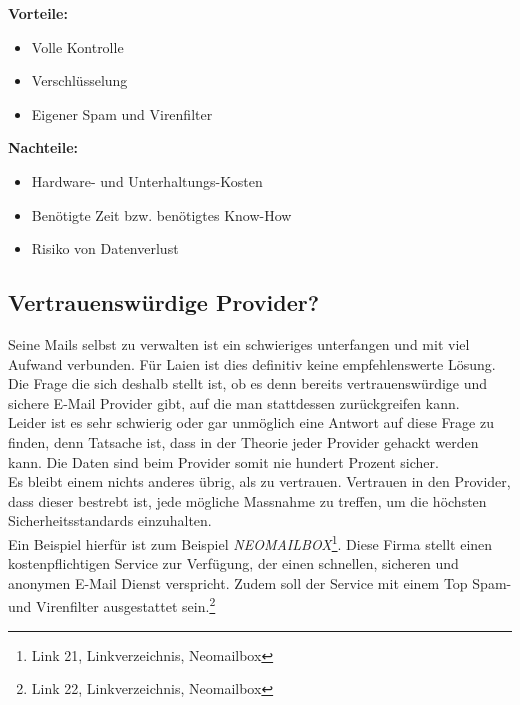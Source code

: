 \textbf{Vorteile:}
\begin{itemize}
    \item Volle Kontrolle
    \item Verschlüsselung
    \item Eigener Spam und Virenfilter
\end{itemize}

\textbf{Nachteile:}
\begin{itemize}
    \item Hardware- und Unterhaltungs-Kosten
    \item Benötigte Zeit bzw. benötigtes Know-How
    \item Risiko von Datenverlust
\end{itemize}

\subsection{Vertrauenswürdige Provider?}
Seine Mails selbst zu verwalten ist ein schwieriges unterfangen und mit viel Aufwand verbunden. Für Laien ist dies definitiv keine empfehlenswerte Lösung. Die Frage die sich deshalb stellt ist, ob es denn bereits vertrauenswürdige und sichere E-Mail Provider gibt, auf die man stattdessen zurückgreifen kann. \\
Leider ist es sehr schwierig oder gar unmöglich eine Antwort auf diese Frage zu finden, denn Tatsache ist, dass in der Theorie jeder Provider gehackt werden kann. Die Daten sind beim Provider somit nie hundert Prozent sicher. \\
Es bleibt einem nichts anderes übrig, als zu vertrauen. Vertrauen in den Provider, dass dieser bestrebt ist, jede mögliche Massnahme zu treffen, um die höchsten Sicherheitsstandards einzuhalten. \\
Ein Beispiel hierfür ist zum Beispiel \textit{NEOMAILBOX}\footnote{Link 21, Linkverzeichnis, Neomailbox}. Diese Firma stellt einen kostenpflichtigen Service zur Verfügung, der einen schnellen, sicheren und anonymen E-Mail Dienst verspricht. Zudem soll der Service mit einem Top Spam- und Virenfilter ausgestattet sein.\footnote{Link 22, Linkverzeichnis, Neomailbox}

